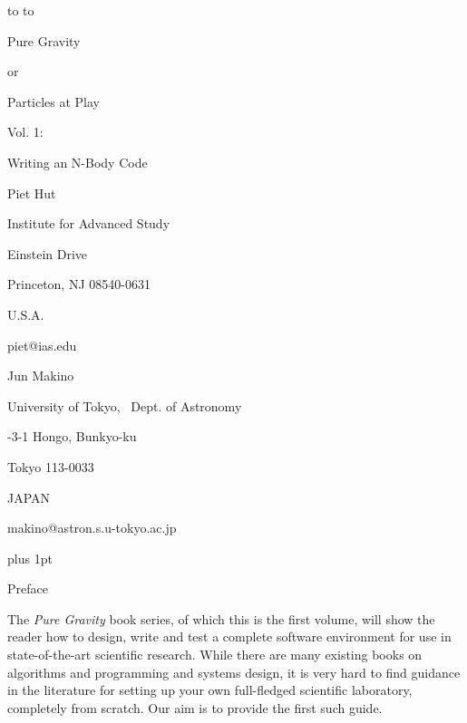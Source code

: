 \documentclass{book}
\def\versiondate{{8 December 2001}}
\def\titleabbrev{{Pure Gravity I}}
\def\undertext#1{{$\underline{\hbox{#1}}$}}
\def\doubleundertext#1{{$\underline{\underline{\hbox{#1}}}$}}
\def\undertext#1{{$\underline{\hbox{#1}}$}}
\def\doubleundertext#1{{$\underline{\underline{\hbox{#1}}}$}}
\begin{document}
\begin{center}

	   \hbox to 
	   \hbox to \hsize{\hfil \undertext\versiondate}
	   \hbox{ }
	   \bigskip
	   \bigskip

{\lgggggb Pure Gravity}

\bigskip

{\lgggb or}

\bigskip

{\lggggb Particles at Play}

\bigskip
\bigskip
\bigskip
\bigskip
\bigskip

{\lgggb Vol. 1:}

\bigskip
\bigskip

{\lgggb Writing an N-Body Code}

\bigskip
\bigskip
\bigskip
\bigskip
\bigskip
\bigskip
\bigskip
\bigskip
\bigskip

{\slgggh Piet Hut}

\medskip
{\slgh Institute for Advanced Study}

\bigskip
{ Einstein Drive}

{\lr Princeton, NJ 08540-0631}

{\lr U.S.A.}

{\lr piet@ias.edu}

\bigskip
\bigskip

{\slgggh Jun Makino}

\medskip
{\slgh University of Tokyo, \ Dept. of Astronomy}

\bigskip
{-3-1 Hongo, Bunkyo-ku}

{\lr Tokyo 113-0033}

{\lr JAPAN}

{\lr makino@astron.s.u-tokyo.ac.jp}

\end{center}


\newpage
{}
%
%
\parskip 8pt plus 1pt
%
%

\begin{center}
{\lgb Preface}
\end{center}

The {\it Pure Gravity} book series, of which this is the first volume,
will show the reader how to design, write and test a complete software
environment for use in state-of-the-art scientific research.  While there
are many existing books on algorithms and programming and systems design,
it is very hard to find guidance in the literature for setting up your own
full-fledged scientific laboratory, completely from scratch.  Our aim is
to provide the first such guide.
\end{document}
